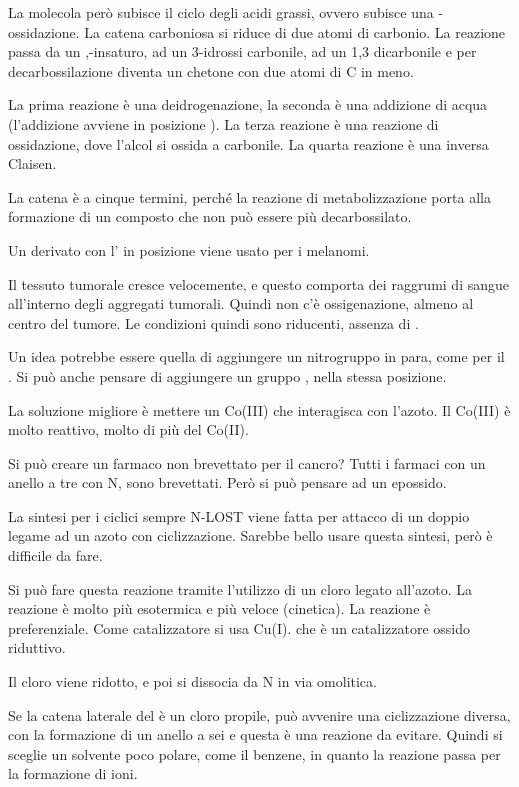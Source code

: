 La molecola però subisce il ciclo degli acidi grassi, ovvero subisce una
\beta-ossidazione. La catena carboniosa si riduce di due atomi di
carbonio. La reazione passa da un \alpha,\beta-insaturo, ad un 3-idrossi
carbonile, ad un 1,3 dicarbonile e per decarbossilazione diventa un
chetone con due atomi di C in meno.

La prima reazione è una deidrogenazione, la seconda è una addizione di
acqua (l'addizione avviene in posizione \beta). La terza reazione è una
reazione di ossidazione, dove l'alcol si ossida a carbonile. La quarta
reazione è una inversa Claisen.

La catena è a cinque termini, perché la reazione di metabolizzazione
porta alla formazione di un composto che non può essere più
decarbossilato.

Un derivato con l' in posizione \alpha viene usato per i
melanomi.

Il tessuto tumorale cresce velocemente, e questo comporta dei raggrumi
di sangue all'interno degli aggregati tumorali. Quindi non c'è
ossigenazione, almeno al centro del tumore. Le condizioni quindi sono
riducenti, assenza di .

Un idea potrebbe essere quella di aggiungere un nitrogruppo in para,
come per il . Si può anche pensare di aggiungere un gruppo
, nella stessa posizione.

La soluzione migliore è mettere un Co(III) che interagisca con l'azoto.
Il Co(III) è molto reattivo, molto di più del Co(II).

Si può creare un farmaco non brevettato per il cancro?
Tutti i farmaci con un anello a tre con N, sono brevettati. Però si può
pensare ad un epossido.

La sintesi per i ciclici sempre N-LOST viene fatta per attacco di un
doppio legame ad un azoto con ciclizzazione. Sarebbe bello usare questa
sintesi, però è difficile da fare.

Si può fare questa reazione tramite l'utilizzo di un cloro legato
all'azoto. La reazione è molto più esotermica e più veloce (cinetica).
La reazione è preferenziale. Come catalizzatore si usa Cu(I). che è un
catalizzatore ossido riduttivo.

Il cloro viene ridotto, e poi si dissocia da N in via omolitica.

Se la catena laterale del è un cloro propile, può avvenire una
ciclizzazione diversa, con la formazione di un anello a sei e questa è
una reazione da evitare. Quindi si sceglie un solvente poco polare, come
il benzene, in quanto la reazione passa per la formazione di ioni.

